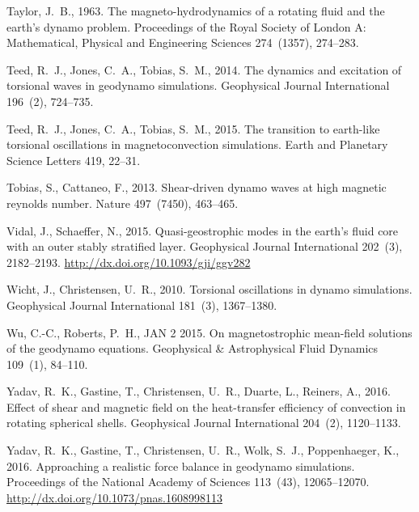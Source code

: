 \documentclass[12pt, a4paper]{article}
\begin{document}
\begin{thebibliography}{73}
Taylor, J.~B., 1963. The magneto-hydrodynamics of a rotating fluid and the
  earth{\textquoteright}s dynamo problem. Proceedings of the Royal Society of
  London A: Mathematical, Physical and Engineering Sciences 274~(1357),
  274--283.

Teed, R.~J., Jones, C.~A., Tobias, S.~M., 2014. The dynamics and excitation of
  torsional waves in geodynamo simulations. Geophysical Journal International
  196~(2), 724--735.

Teed, R.~J., Jones, C.~A., Tobias, S.~M., 2015. The transition to earth-like
  torsional oscillations in magnetoconvection simulations. Earth and Planetary
  Science Letters 419, 22--31.

Tobias, S., Cattaneo, F., 2013. Shear-driven dynamo waves at high magnetic
  reynolds number. Nature 497~(7450), 463--465.

Vidal, J., Schaeffer, N., 2015. Quasi-geostrophic modes in the earth's fluid
  core with an outer stably stratified layer. Geophysical Journal International
  202~(3), 2182--2193.
\newline\urlprefix\url{http://dx.doi.org/10.1093/gji/ggv282}

Wicht, J., Christensen, U.~R., 2010. Torsional oscillations in dynamo
  simulations. Geophysical Journal International 181~(3), 1367--1380.

Wu, C.-C., Roberts, P.~H., {JAN 2} {2015}. {On magnetostrophic mean-field
  solutions of the geodynamo equations}. Geophysical \& Astrophysical Fluid
  Dynamics {109}~({1}), {84--110}.

Yadav, R.~K., Gastine, T., Christensen, U.~R., Duarte, L., Reiners, A.,
  2016{}. Effect of shear and magnetic field on the heat-transfer
  efficiency of convection in rotating spherical shells. Geophysical Journal
  International 204~(2), 1120--1133.

Yadav, R.~K., Gastine, T., Christensen, U.~R., Wolk, S.~J., Poppenhaeger, K.,
  2016{}. Approaching a realistic force balance in geodynamo
  simulations. Proceedings of the National Academy of Sciences 113~(43),
  12065--12070.
\newline\urlprefix\url{http://dx.doi.org/10.1073/pnas.1608998113}

\end{thebibliography}
\end{document}
